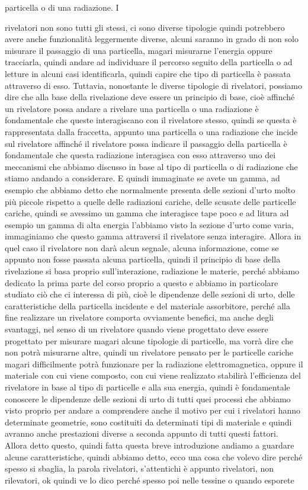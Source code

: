 particella o di una radiazione. I 

rivelatori non sono tutti gli stessi, ci sono diverse tipologie quindi potrebbero avere anche funzionalità leggermente diverse, alcuni saranno in grado di non solo misurare il passaggio di una particella, magari misurarne l'energia oppure tracciarla, quindi andare ad individuare il percorso seguito della particella o ad letture in alcuni casi identificarla, quindi capire che tipo di particella è passata attraverso di esso. Tuttavia, nonostante le diverse tipologie di rivelatori, possiamo dire che alla base della rivelazione deve essere un principio di base, cioè affinché un rivelatore possa andare a rivelare una particella o una radiazione è fondamentale che queste interagiscano con il rivelatore stesso, quindi se questa è rappresentata dalla fraccetta, appunto una particella o una radiazione che incide sul rivelatore affinché il rivelatore possa indicare il passaggio della particella è fondamentale che questa radiazione interagisca con esso attraverso uno dei meccanismi che abbiamo discusso in base al tipo di particella o di radiazione che stiamo andando a considerare. E quindi immaginate se avete un gamma, ad esempio che abbiamo detto che normalmente presenta delle sezioni d'urto molto più piccole rispetto a quelle delle radiazioni cariche, delle scusate delle particelle cariche, quindi se avessimo un gamma che interagisce tape poco e ad litura ad esempio un gamma di alta energia l'abbiamo visto la sezione d'urto come varia, immaginiamo che questo gamma attraversi il rivelatore senza interagire. Allora in quel caso il rivelatore non darà alcun segnale, alcuna informazione, come se appunto non fosse passata alcuna particella, quindi il principio di base della rivelazione si basa proprio sull'interazione, radiazione le materie, perché abbiamo dedicato la prima parte del corso proprio a questo e abbiamo in particolare studiato ciò che ci interessa di più, cioè le dipendenze delle sezioni di urto, delle caratteristiche della particella incidente e del materiale assorbitore, perché alla fine realizzare un rivelatore comporta ovviamente benefici, ma anche degli svantaggi, nel senso di un rivelatore quando viene progettato deve essere progettato per misurare magari alcune tipologie di particelle, ma vorrà dire che non potrà misurarne altre, quindi un rivelatore pensato per le particelle cariche magari difficilmente potrà funzionare per la radiazione elettromagnetica, oppure il materiale con cui viene composto, con cui viene realizzato stabilirà l'efficienza del rivelatore in base al tipo di particelle e alla sua energia, quindi è fondamentale conoscere le dipendenze delle sezioni di urto di tutti quei processi che abbiamo visto proprio per andare a comprendere anche il motivo per cui i rivelatori hanno determinate geometrie, sono costituiti da determinati tipi di materiale e quindi avranno anche prestazioni diverse a seconda appunto di tutti questi fattori. Allora detto questo, quindi fatta questa breve introduzione andiamo a guardare alcune caratteristiche, quindi abbiamo detto, ecco una cosa che volevo dire perché spesso si sbaglia, la parola rivelatori, s'attentichi è appunto rivelatori, non rilevatori, ok quindi ve lo dico perché spesso poi nelle tessine o quando esporete 